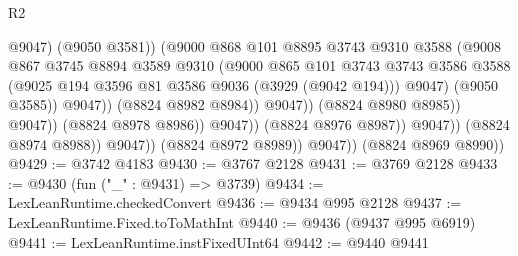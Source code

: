 \begin{lexlean}{R2}
\begin{coremodule}
                                                @9047)
                                              (@9050 @3581))
                                            (@9000
                                              @868
                                              @101
                                              @8895
                                              @3743
                                              @9310
                                              @3588
                                              (@9008
                                                @867
                                                @3745
                                                @8894
                                                @3589
                                                @9310
                                                (@9000
                                                  @865
                                                  @101
                                                  @3743
                                                  @3743
                                                  @3586
                                                  @3588
                                                  (@9025
                                                    @194
                                                    @3596
                                                    @81
                                                    @3586
                                                    @9036
                                                    (@3929 (@9042 @194)))
                                                  @9047)
                                                (@9050 @3585))
                                              @9047))
                                          (@8824 @8982 @8984))
                                        @9047))
                                    (@8824 @8980 @8985))
                                  @9047))
                              (@8824 @8978 @8986))
                            @9047))
                        (@8824 @8976 @8987))
                      @9047))
                  (@8824 @8974 @8988))
                @9047))
            (@8824 @8972 @8989))
          @9047))
      (@8824 @8969 @8990))
@9429 := @3742 @4183
@9430 := @3767 @2128
@9431 := @3769 @2128
@9433 := @9430 (fun ("_" : @9431) => @3739)
@9434 := LexLeanRuntime.checkedConvert
@9436 := @9434 @995 @2128
@9437 := LexLeanRuntime.Fixed.toToMathInt
@9440 := @9436 (@9437 @995 @6919)
@9441 := LexLeanRuntime.instFixedUInt64
@9442 := @9440 @9441

\end{coremodule}
\end{lexlean}

